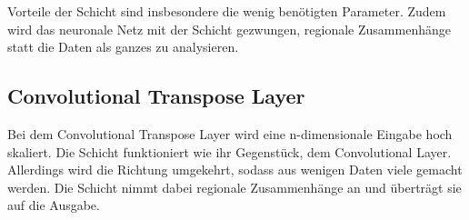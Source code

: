 Vorteile der Schicht sind insbesondere die wenig benötigten Parameter.
Zudem wird das neuronale Netz mit der Schicht gezwungen, regionale Zusammenhänge statt die Daten als ganzes zu analysieren.

\subsection{Convolutional Transpose Layer}
Bei dem Convolutional Transpose Layer wird eine n-dimensionale Eingabe hoch skaliert.
Die Schicht funktioniert wie ihr Gegenstück, dem Convolutional Layer.
Allerdings wird die Richtung umgekehrt, sodass aus wenigen Daten viele gemacht werden.
Die Schicht nimmt dabei regionale Zusammenhänge an und überträgt sie auf die Ausgabe.


\begin{comment}
	
\section{Stichpunkte}
\subsection{GAN}
\paragraph{Anwendung}
\begin{itemize}
	\item Viel bei Generierungsaufgaben
	\item eignet sich immer bei Aufgaben, bei denen es keine klare Lösung gibt
\end{itemize}


\paragraph{Aufbau \cite{gan-original-paper, hyperparameters-gan-using-genetic-algorithm}}
\begin{itemize}
	\item 2 Neuronale Netze (Discriminator und Generator), die sich gegenseitig trainieren
	\item Generator: ist für die Bildgenerierung zuständig
	\item Discriminator: ist für die Bildverfizierung zuständig (echt oder fake)
	\item nach dem Training ist in der Regel nur noch der Generator interessant
	

\end{comment}
